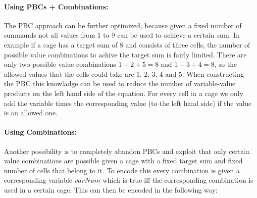 \paragraph{Using PBCs + Combinations:}
The PBC approach can be further optimized, because given a fixed number of summands not all values from 1 to 9 can be used to achieve a certain sum. In example if a cage has a target sum of 8 and consists of three cells, the number of possible value combinations to achive the target sum is fairly limited. There are only two possible value combinations $1+2+5=8$ and $1+3+4=8$, so the allowed values that the cells could take are 1, 2, 3, 4 and 5. When constructing the PBC this knowladge can be used to reduce the number of variable-value products on the left hand side of the equation. For every cell in a cage we only add the variable times the corresponding value (to the left hand side) if the value is an allowed one.

\paragraph{Using Combinations:}
Another possibility is to completely abandon PBCs and exploit that only certain value combinations are possible given a cage with a fixed target sum and fixed number of cells that belong to it. To encode this every combination is given a corresponding variable $varNum$ which is true iff the corresponding combination is used in a certain cage. This can then be encoded in the following way:\\

